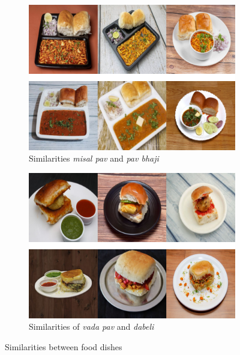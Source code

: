 \documentclass{article}
\begin{document}
\begin{figure}[h]
    \centering
    \begin{subfigure}{0.45\linewidth}
        \centering
    	\includegraphics[width=\linewidth]{figs/similar_items_0.pdf}     
    	\caption{Similarities \textit{misal pav} and \textit{pav bhaji}}
    	\label{fig:similar-zero}
    \end{subfigure}
    \hfill
    \begin{subfigure}{0.45\linewidth}
        \centering
    	\includegraphics[width=\linewidth]{figs/similar_items_1.pdf}
    	\caption{Similarities of \textit{vada pav}  and \textit{dabeli}}
    	\label{fig:similar-one}
    \end{subfigure}
    \caption{Similarities between food dishes}
    \label{fig:similar-representations}
\end{figure}
\end{document}
